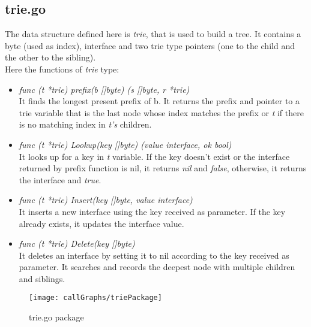 \subsection{trie.go} 

The data structure defined here is \emph{trie}, that is used to build a tree. It contains a byte (used as index), interface and two trie type pointers (one to the child and the other to the sibling).\\
Here the functions of \emph{trie} type:

\begin{itemize}

\item \emph{func (t *trie) prefix(b []byte) (s []byte, r *trie)}\\
It finds the longest present prefix of b. It returns the prefix and pointer to a trie variable that is the last node whose index matches the prefix or \emph{t} if there is no matching index in \emph{t's} children.

\item \emph{func (t *trie) Lookup(key []byte) (value interface{}, ok bool)}\\
It looks up for a key in \emph{t} variable. If the key doesn't exist or the interface returned by prefix function is nil, it returns \emph{nil} and \emph{false}, otherwise, it returns the interface and \emph{true}.

\item \emph{func (t *trie) Insert(key []byte, value interface{})}\\
It inserts a new interface using the key received as parameter. If the key already exists, it updates the interface value.

\item \emph{func (t *trie) Delete(key []byte)}\\
It deletes an interface by setting it to nil according to the key received as parameter. It searches and records the deepest node with multiple children and siblings.

\end{itemize}

\begin{figure}[H]
\centering
\texttt{[image: callGraphs/triePackage]}
\caption{trie.go package}
\end{figure}